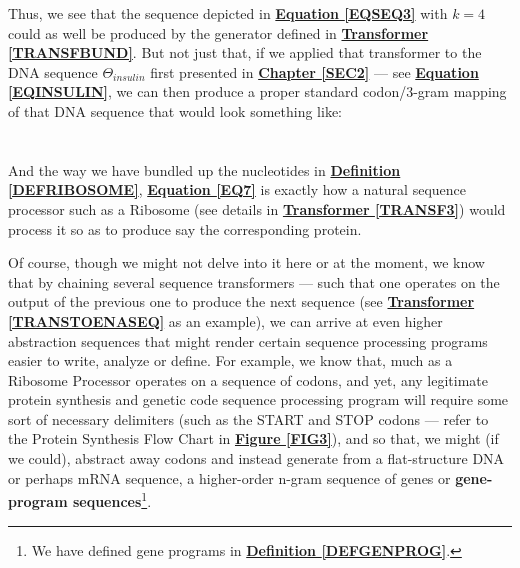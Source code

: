 \documentclass[a4paper, 18pt]{book} %
\begin{document}
Thus, we see that the sequence depicted in \textbf{\hyperref[EQSEQ3]{Equation \ref{EQSEQ3}}} with $k=4$ could as well be produced by the generator defined in \textbf{\hyperref[TRANSFBUND]{Transformer \ref{TRANSFBUND}}}. But not just that, if we applied that transformer to the DNA sequence $\Theta_{insulin}$ first presented in \textbf{\hyperref[SEC2]{Chapter \ref{SEC2}}} --- see \textbf{\hyperref[EQINSULIN]{Equation \ref{EQINSULIN}}}, we can then produce a proper standard codon/3-gram mapping of that DNA sequence that would look something like:\\


\\\\

And the way we have bundled up the nucleotides in \textbf{\hyperref[DEFRIBOSOME]{Definition \ref{DEFRIBOSOME}}}, \textbf{\hyperref[EQ7]{Equation \ref{EQ7}}} is exactly how a natural sequence processor such as a Ribosome (see details in \textbf{\hyperref[TRANSF3]{Transformer \ref{TRANSF3}}}) would process it so as to produce say the corresponding protein.

Of course, though we might not delve into it here or at the moment, we know that by chaining several sequence transformers --- such that one operates on the output of the previous one to produce the next sequence (see \textbf{\hyperref[TRANSTOENASEQ]{Transformer \ref{TRANSTOENASEQ}}} as an example), we can arrive at even higher abstraction sequences that might render certain sequence processing programs easier to write, analyze or define. For example, we know that, much as a Ribosome Processor operates on a sequence of codons, and yet, any legitimate protein synthesis and genetic code sequence processing program will require some sort of necessary delimiters (such as the START and STOP codons --- refer to the Protein Synthesis Flow Chart in \textbf{\hyperref[FIG3]{Figure \ref{FIG3}}}), and so that, we might (if we could), abstract away codons and instead generate from a flat-structure DNA or perhaps mRNA sequence, a higher-order n-gram sequence of genes or \textbf{gene-program sequences}\footnote{We have defined gene programs in \textbf{\hyperref[DEFGENPROG]{Definition \ref{DEFGENPROG}}}.}.
\end{document}
